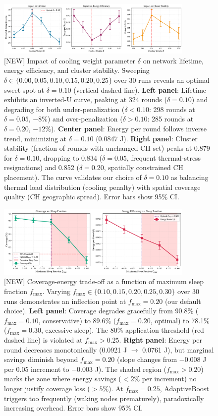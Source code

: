\begin{figure}[ht]
  \centering
  \includegraphics[width=0.85\textwidth]{figures/sweep_delta.pdf}
  \caption{[NEW] Impact of cooling weight parameter $\delta$ on network lifetime, energy efficiency, and cluster stability. Sweeping $\delta \in \{0.00, 0.05, 0.10, 0.15, 0.20, 0.25\}$ over 30 runs reveals an optimal sweet spot at $\delta=0.10$ (vertical dashed line). \textbf{Left panel}: Lifetime exhibits an inverted-U curve, peaking at 324 rounds ($\delta=0.10$) and degrading for both under-penalization ($\delta<0.10$: 298 rounds at $\delta=0.05$, $-8\%$) and over-penalization ($\delta>0.10$: 285 rounds at $\delta=0.20$, $-12\%$). \textbf{Center panel}: Energy per round follows inverse trend, minimizing at $\delta=0.10$ (0.0847 J). \textbf{Right panel}: Cluster stability (fraction of rounds with unchanged CH set) peaks at 0.879 for $\delta=0.10$, dropping to 0.834 ($\delta=0.05$, frequent thermal-stress resignations) and 0.852 ($\delta=0.20$, spatially constrained CH placement). The curve validates our choice of $\delta=0.10$ as balancing thermal load distribution (cooling penalty) with spatial coverage quality (CH geographic spread). Error bars show 95\% CI.}
  \label{fig:sweep-delta}
\end{figure}

\begin{figure}[ht]
  \centering
  \includegraphics[width=0.85\textwidth]{figures/sweep_fmax.pdf}
  \caption{[NEW] Coverage-energy trade-off as a function of maximum sleep fraction $f_{\max}$. Varying $f_{\max} \in \{0.10, 0.15, 0.20, 0.25, 0.30\}$ over 30 runs demonstrates an inflection point at $f_{\max}=0.20$ (our default choice). \textbf{Left panel}: Coverage degrades gracefully from 90.8\% ($f_{\max}=0.10$, conservative) to 89.6\% ($f_{\max}=0.20$, optimal) to 78.1\% ($f_{\max}=0.30$, excessive sleep). The 80\% application threshold (red dashed line) is violated at $f_{\max}>0.25$. \textbf{Right panel}: Energy per round decreases monotonically (0.0921 J $\to$ 0.0761 J), but marginal savings diminish beyond $f_{\max}=0.20$ (slope changes from $-0.008$ J per 0.05 increment to $-0.003$ J). The shaded region ($f_{\max}>0.20$) marks the zone where energy savings ($<2\%$ per increment) no longer justify coverage loss ($>5\%$). At $f_{\max}=0.25$, AdaptiveBoost triggers too frequently (waking nodes prematurely), paradoxically increasing overhead. Error bars show 95\% CI.}
  \label{fig:sweep-fmax}
\end{figure}


